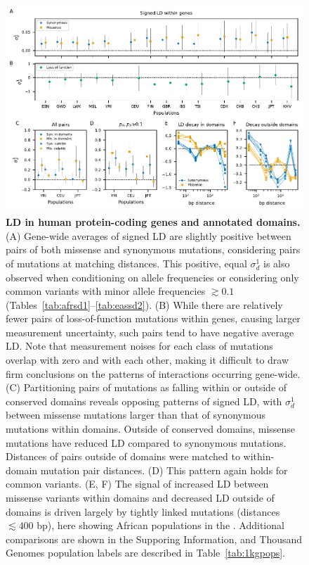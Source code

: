 \documentclass[]{article}
\begin{document}
\begin{figure}[tb!]
    \centering
    \includegraphics{../figures/data_compact}
    \caption{
        \textbf{LD in human protein-coding genes and annotated domains.}
        (A) Gene-wide averages of signed LD are slightly positive between pairs
        of both missense and synonymous mutations, considering pairs of mutations
        at matching distances. This positive, equal \(\sigma_d^1\) is also observed
        when conditioning on allele frequencies or considering only common variants
        with minor allele frequencies \(\gtrsim 0.1\)
        (Tables~\ref{tab:afrsd1}--\ref{tab:eassd2}).
        (B) While there are relatively fewer pairs of loss-of-function mutations
        within genes, causing larger measurement uncertainty, such pairs tend to have
        negative average LD. Note that measurement noises for each class of
        mutations overlap with zero and with each other, making it difficult to
        draw firm conclusions on the patterns of interactions occurring gene-wide.
        (C) Partitioning pairs of mutations as falling within or outside
        of conserved domains reveals opposing patterns of signed LD, with
        \(\sigma_d^1\) between missense mutations larger than that of synonymous
        mutations within domains. Outside of conserved domains, missense mutations
        have reduced LD compared to synonymous mutations. Distances of pairs outside
        of domains were matched to within-domain mutation pair distances.
        (D) This pattern again holds for common variants.
        (E, F) The signal of increased LD between missense variants within domains
        and decreased LD outside of domains is driven largely by tightly linked
        mutations (distances \(\lesssim 400\) bp), here showing African populations
        in the \citet{1000_Genomes_Project_Consortium2015-zq}.
        Additional comparisons are shown in the Supporing Information, and Thousand
        Genomes population labels are described in Table~\ref{tab:1kgpops}.
    }
    \label{fig:data}
\end{figure}
\end{document}
